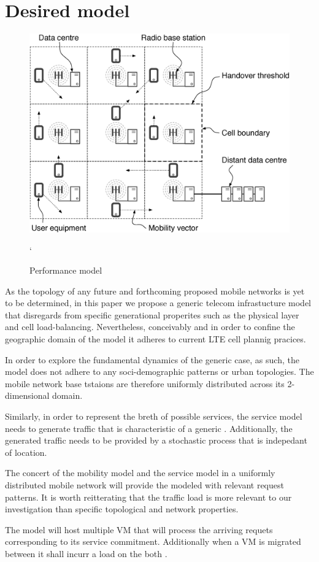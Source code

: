 \section{Desired model}

\begin{figure}[tb]
	\centering
	\includegraphics[width=\linewidth]{desiard_model.eps} 
	\caption{Performance model}
	\label{fig:performance_model}`
\end{figure}

As the topology of any future \xcloud and forthcoming proposed mobile networks is yet to be determined, in this paper we propose a generic telecom infrastucture model that disregards from specific generational properites such as the physical layer and cell load-balancing. Nevertheless, conceivably and in order to confine the geographic domain of the model it adheres to current LTE cell plannig pracices. 

In order to explore the fundamental dynamics of the generic case, as such, the model does not adhere to any soci-demographic patterns or urban topologies. The mobile network base tstaions are therefore uniformly distributed across its 2-dimensional domain.

Similarly, in order to represent the breth of possible services, the service model needs to generate traffic that is characteristic of a generic \ue. Additionally, the generated traffic needs to be provided by a stochastic process that is indepedant of location.

The concert of the mobility model and the service model in a uniformly distributed mobile network will provide the modeled \dcs with relevant request patterns. It is worth reitterating that the traffic load is more relevant to our investigation than specific topological and network properties.

The \dc model will host multiple VM that will process the arriving requets corresponding to its service commitment. Additionally when a VM is migrated between \dcs it shall incurr a load on the both \dcs.